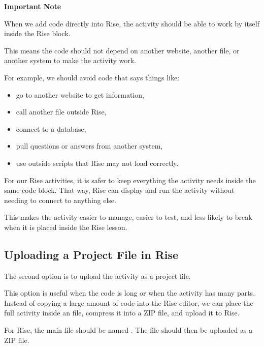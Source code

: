 \documentclass{article}
\begin{document}
\begin{attentionbox}
  \textbf{\Bitter\textcolor{naranja}{Important Note}}

  When we add code directly into Rise, the activity should be able to work by itself inside the Rise block.

  This means the code should not depend on another website, another file, or another system to make the activity work.

  For example, we should avoid code that says things like:

  \begin{itemize}[leftmargin=1.2cm, itemsep=4pt]
    \item go to another website to get information,
    \item call another file outside Rise,
    \item connect to a database,
    \item pull questions or answers from another system,
    \item use outside scripts that Rise may not load correctly.
  \end{itemize}

  For our Rise activities, it is safer to keep everything the activity needs inside the same code block. That way, Rise can display and run the activity without needing to connect to anything else.
\end{attentionbox}

This makes the activity easier to manage, easier to test, and less likely to break when it is placed inside the Rise lesson.

\vspace{0.4cm}

\subsection*{\Bitter\textcolor{naranja}{Uploading a Project File in Rise}}
\label{subsec:upload-project-rise}

The second option is to upload the activity as a project file.

This option is useful when the code is long or when the activity has many parts. Instead of copying a large amount of code into the Rise editor, we can place the full activity inside an  file, compress it into a ZIP file, and upload it to Rise.

For Rise, the main file should be named . The file should then be uploaded as a ZIP file.
\end{document}
